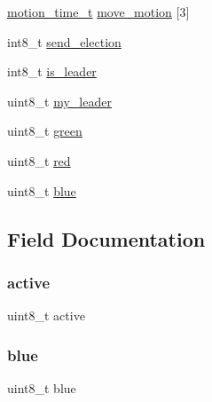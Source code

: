 \begin{DoxyCompactItemize}
\item 
\hyperlink{structmotion__time__t}{motion\+\_\+time\+\_\+t} \hyperlink{struct_u_s_e_r_d_a_t_a_a3398ac63ab67360828efdd1bef369245}{move\+\_\+motion} \mbox{[}3\mbox{]}
\item 
int8\+\_\+t \hyperlink{struct_u_s_e_r_d_a_t_a_ae0a633699328bd620301ffd914a44411}{send\+\_\+election}
\item 
int8\+\_\+t \hyperlink{struct_u_s_e_r_d_a_t_a_a4a20308ddbf35161cb24b5e5d9ca461e}{is\+\_\+leader}
\item 
uint8\+\_\+t \hyperlink{struct_u_s_e_r_d_a_t_a_a723f83660580bb0c28d7d3a92d02039e}{my\+\_\+leader}
\item 
uint8\+\_\+t \hyperlink{struct_u_s_e_r_d_a_t_a_a90d21fa503b626c00cdc8d94863d5877}{green}
\item 
uint8\+\_\+t \hyperlink{struct_u_s_e_r_d_a_t_a_ad47d918910aaa51c73160ac85999d09c}{red}
\item 
uint8\+\_\+t \hyperlink{struct_u_s_e_r_d_a_t_a_a287b397e90d7b995c81ff54e741f96b2}{blue}
\end{DoxyCompactItemize}


\subsection{Field Documentation}
\mbox{\label{struct_u_s_e_r_d_a_t_a_a05c940dbc220f5a723afd70071aebff8}} 
\subsubsection{\texorpdfstring{active}{active}}
{\footnotesize\ttfamily uint8\+\_\+t active}

\mbox{\label{struct_u_s_e_r_d_a_t_a_a287b397e90d7b995c81ff54e741f96b2}} 
\subsubsection{\texorpdfstring{blue}{blue}}
{\footnotesize\ttfamily uint8\+\_\+t blue}

\mbox{\label{struct_u_s_e_r_d_a_t_a_a01bba9e445a0f16707267c0ce23fb9b0}} 

